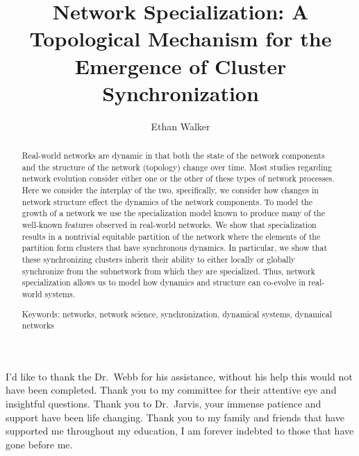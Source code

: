 \documentclass[12pt]{thesis}
\author{Ethan Walker} %
\title{Network Specialization: A Topological Mechanism for the Emergence of Cluster Synchronization}
\begin{document}
\setlength{\abovedisplayskip}{3pt}
\setlength{\belowdisplayskip}{3pt}

\frontmatter
\maketitle  %

\begin{abstract} %

\qquad Real-world networks are dynamic in that both the state of the network components and the structure of the network (topology) change over time. 
Most studies regarding network evolution consider either one or the other of these types of network processes.
Here we consider the interplay of the two, specifically, we consider how changes in network structure effect the dynamics of the network components.
To model the growth of a network we use the specialization model known to produce many of the well-known features observed in real-world networks. 
We show that specialization results in a nontrivial equitable partition of the network where the elements of the partition form clusters that have synchronous dynamics.
In particular, we show that these synchronizing clusters inherit their ability to either locally or globally synchronize from the subnetwork from which they are specialized.
Thus, network specialization allows us to model how dynamics and structure can co-evolve in real-world systems.

\vskip 4.5in
 
\noindent Keywords: networks, network science, synchronization, dynamical systems, dynamical networks %
\end{abstract}


\begin{acknowledgements}
\qquad I'd like to thank the Dr.~Webb for his assistance, without his help this would not have been completed.
Thank you to my committee for their attentive eye and insightful questions.
Thank you to Dr.~Jarvis, your immense patience and support have been life changing.
Thank you to my family and friends that have supported me throughout my education, I am forever indebted to those that have gone before me.
\end{acknowledgements}
\end{document}

